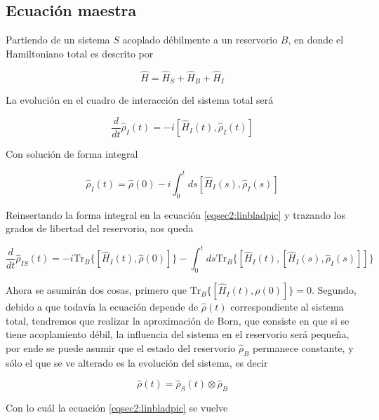 \subsection{Ecuación maestra}
Partiendo de un sistema $S$ acoplado débilmente a un reservorio $B$, en donde el Hamiltoniano total es descrito por 

\begin{equation*}
    \hat{H} = \hat{H}_{S} + \hat{H}_{B} + \hat{H}_{I}
\end{equation*}

La evolución en el cuadro de interacción del sistema total será

\begin{equation}
    \frac{d}{dt}\hat{\rho}_{I}(t) = -i[\hat{H}_{I}(t), \hat{\rho}_{I}(t)]
    \label{eqsec2:linbladpic}
\end{equation}

Con solución de forma integral

\begin{equation*}
    \hat{\rho}_{I}(t) = \hat{\rho}(0) - i \int_{0}^{t} ds[\hat{H}_{I}(s), \hat{\rho}_{I}(s)]
\end{equation*}

Reinsertando la forma integral en la ecuación \ref{eqsec2:linbladpic} y trazando los grados de libertad del reservorio, nos queda

\begin{equation}
    \frac{d}{dt}\hat{\rho}_{IS}(t) = -i \text{Tr}_{B}\{[\hat{H}_{I}(t),\hat{\rho}(0)] \}  -  \int_{0}^{t}ds \text{Tr}_{B}\{[\hat{H}_{I}(t), [\hat{H}_{I}(s),\hat{\rho}_{I}(s)]]\}
\end{equation}

Ahora se asumirán dos cosas, primero que $\text{Tr}_{B}\{[\hat{H}_{I}(t),\rho(0)] \} = 0$. Segundo, debido a que todavía la ecuación depende de $\hat{\rho}(t)$ correspondiente al sistema total, tendremos que realizar la aproximación de Born, que consiste en que si se tiene acoplamiento débil, la influencia del sistema en el reservorio será pequeña, por ende se puede asumir que el estado del reservorio $\hat{\rho}_{B}$ permanece constante, y sólo el que se ve alterado es la evolución del sistema, es decir

\begin{equation*}
    \hat{\rho}(t) = \hat{\rho}_{S}(t)\otimes \hat{\rho}_{B}
\end{equation*}

Con lo cuál la ecuación \ref{eqsec2:linbladpic} se vuelve

